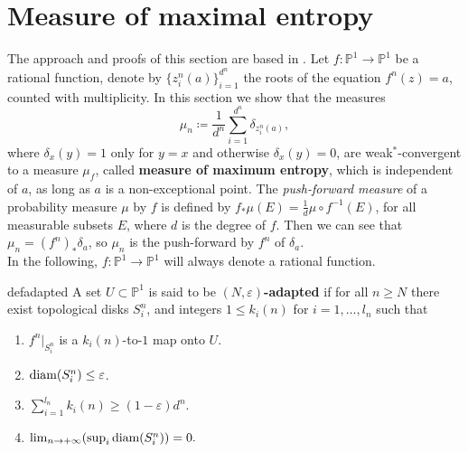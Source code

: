 \section{Measure of maximal entropy}\label{sectionmaximummeasure}

The approach and proofs of this section are based in \cite{lopes}. Let $f:\mathbb{P}^1 \rightarrow \mathbb{P}^1$ be a rational function, denote by $\{z_i^n(a)\}_{i=1}^{d^n}$ the roots of the equation $f^n(z)=a$, counted with multiplicity. In this section we show that the measures
\begin{equation}\label{diracs}
\mu_n\coloneqq \frac{1}{d^n}\sum_{i=1}^{d^n} \delta_{z_i^n(a)},
\end{equation}
where $\delta_x(y)=1$ only for $y=x$ and otherwise $\delta_x(y)=0$, are weak$^*$-convergent to a measure $\mu_f$, called {\bf measure of maximum entropy}, which is independent of $a$, as long as $a$ is a non-exceptional point. The \emph{push-forward measure} of a probability measure $\mu$ by $f$ is defined by $f_*\mu(E) = \frac{1}{d}\mu \circ f^{-1}(E)$, for all measurable subsets $E$, where $d$ is the degree of $f$. Then we can see that $\mu_n = (f^n)_*\delta_a$, so $\mu_n$ is the push-forward by $f^n$ of $\delta_a$.\\

In the following, $f:\mathbb{P}^1 \rightarrow \mathbb{P}^1$ will always denote a rational function.\\

\begin{mydef}{}{defadapted}
A set $U\subset \mathbb{P}^1$ is said to be {\bf $(N,\varepsilon)$-adapted} if for all $n\geq N$ there exist topological disks $S_i^n$, and integers $1\leq k_i(n)$ for $i=1,\dots,l_n$ such that 
\begin{enumerate}
\item $f^n|_{S_i^n}$ is a $k_i(n)$-to-$1$ map onto $U$.\\
\item $\text{diam}(S_i^n) \leq \varepsilon$.\\
\item $\sum_{i=1}^{l_n}k_i(n) \geq (1-\varepsilon)d^n$.\\
\item $\lim_{n \rightarrow +\infty} (\sup_{i} \text{diam} (S_i^n))=0.$
\end{enumerate} 
\end{mydef}

